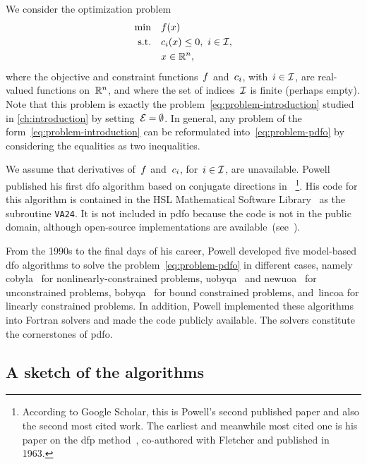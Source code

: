 We consider the optimization problem
\begin{subequations}
    \label{eq:problem-pdfo}
    \begin{align}
        \min        & \quad \obj(\iter)\\
        \text{s.t.} & \quad \con{i}(\iter) \le 0, ~ i \in \iub,\\
                    & \quad \iter \in \R^n, \nonumber
    \end{align}
\end{subequations}
where the objective and constraint functions~$f$ and~$c_{i}$, with~$i \in \mathcal{I}$, are real-valued functions on~$\mathbb{R}^n$, and where the set of indices~$\mathcal{I}$ is finite (perhaps empty).
Note that this problem is exactly the problem~\cref{eq:problem-introduction} studied in \cref{ch:introduction} by setting~$\mathcal{E} = \emptyset$.
In general, any problem of the form~\cref{eq:problem-introduction} can be reformulated into~\cref{eq:problem-pdfo} by considering the equalities as two inequalities.

We assume that derivatives of~$f$ and~$c_{i}$, for~$i \in \mathcal{I}$, are unavailable.
Powell published his first \gls{dfo} algorithm based on conjugate directions in \citeyear{Powell_1964}~\cite{Powell_1964}\footnote{According to Google Scholar, this is Powell's second published paper and also the second most cited work. The earliest and meanwhile most cited one is his paper on the \gls{dfp} method~\cite{Fletcher_Powell_1963}, co-authored with Fletcher and published in 1963.}.
His code for this algorithm is contained in the HSL Mathematical Software Library~\cite{HSL} as the subroutine \texttt{VA24}.
It is not included in \gls{pdfo} because the code is not in the public domain, although open-source implementations are available~(see~\cite[Fn.~4]{Conn_Scheinberg_Toint_1997b}).

From the 1990s to the final days of his career, Powell developed five model-based \gls{dfo} algorithms to solve the problem~\cref{eq:problem-pdfo} in different cases, namely \gls{cobyla}~\cite{Powell_1994} for nonlinearly-constrained problems, \gls{uobyqa}~\cite{Powell_2002} and \gls{newuoa}~\cite{Powell_2006} for unconstrained problems, \gls{bobyqa}~\cite{Powell_2009} for bound constrained problems, and~\gls{lincoa} for linearly constrained problems.
In addition, Powell implemented these algorithms into Fortran solvers and made the code publicly available.
The solvers constitute the cornerstones of \gls{pdfo}.

\subsection{A sketch of the algorithms}

